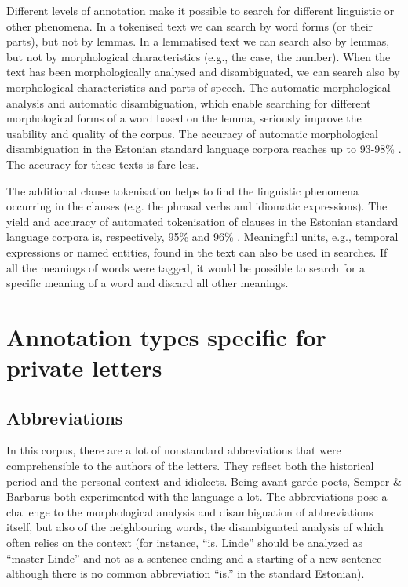 \documentclass[runningheads]{llncs}
\begin{document}
Different levels of annotation make it possible to search for different linguistic or other phenomena. In a tokenised text we can search by word forms (or their parts), but not by lemmas. In a lemmatised text we can search also by lemmas, but not by morphological characteristics (e.g., the case, the number). When the text has been morphologically analysed and disambiguated, we can search also by morphological characteristics and parts of speech. The automatic morphological analysis and automatic disambiguation, which enable searching for different morphological forms of a word based on the lemma, seriously improve the usability and quality of the corpus. The accuracy of automatic morphological disambiguation in the Estonian standard language corpora reaches up to 93-98\% \cite{veskisliba}.  The accuracy for these texts is fare less.


The additional clause tokenisation helps to find the linguistic phenomena occurring in the clauses (e.g. the phrasal verbs and idiomatic expressions). The yield and accuracy of automated tokenisation of clauses in the Estonian standard language corpora is, respectively, 95\% and 96\% \cite{Kaalep2012}. Meaningful units, e.g., temporal expressions or named entities, found in the text can also be used in searches. If all the meanings of words were tagged, it would be possible to search for a specific meaning of a word and discard all other meanings. 

\section{Annotation types specific for private letters}

\subsection{Abbreviations}

In this corpus, there are a lot of nonstandard abbreviations that were comprehensible to the authors of the letters. They reflect both the historical period and the personal context and idiolects. Being avant-garde poets, Semper \& Barbarus both experimented with the language a lot. The abbreviations pose a challenge to the morphological analysis and disambiguation of abbreviations itself, but also of the neighbouring words, the disambiguated analysis of which often relies on the context (for instance, “is. Linde” should be analyzed as “master Linde” and not as a sentence ending and a starting of a new sentence although there is no common abbreviation “is.” in the standard Estonian). 
\end{document}

